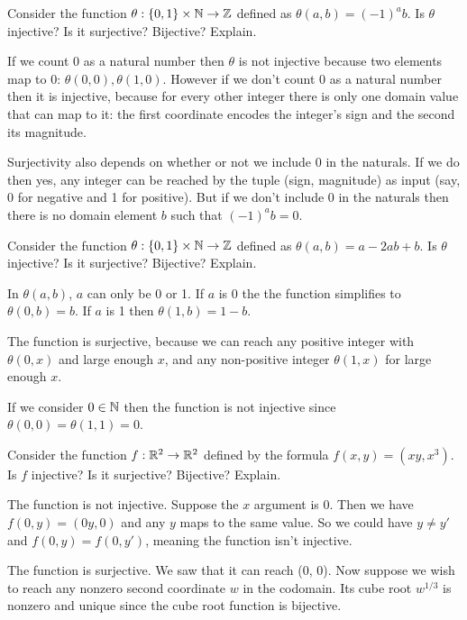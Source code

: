 \documentclass{article}
\begin{document}
\begin{problem}
Consider the function $\theta: \{0, 1\} \times \mathbb{N} \to \mathbb{Z}$ defined as $\theta(a, b) = (-1)^a b.$ Is $\theta$ injective? Is it surjective? Bijective? Explain.
\end{problem}

If we count 0 as a natural number then $\theta$ is not injective because two elements map to 0: $\theta(0, 0), \theta(1, 0)$. However if we don't count 0 as a natural number then it is injective, because for every other integer there is only one domain value that can map to it: the first coordinate encodes the integer's sign and the second its magnitude.

Surjectivity also depends on whether or not we include 0 in the naturals. If we do then yes, any integer can be reached by the tuple (sign, magnitude) as input (say, 0 for negative and 1 for positive). But if we don't include 0 in the naturals then there is no domain element $b$ such that $(-1)^a b = 0$.

\begin{problem}
Consider the function $\theta: \{0, 1\} \times \mathbb{N} \to \mathbb{Z}$ defined as $\theta(a, b) = a - 2ab + b$. Is $\theta$ injective? Is it surjective? Bijective? Explain.
\end{problem}

In $\theta(a, b)$, $a$ can only be 0 or 1. If $a$ is 0 the the function simplifies to $\theta(0, b) = b$. If $a$ is 1 then $\theta(1, b) = 1 - b$.

The function is surjective, because we can reach any positive integer with $\theta(0, x)$ and large enough $x$, and any non-positive integer $\theta(1, x)$ for large enough $x$.

If we consider $0 \in \mathbb{N}$ then the function is not injective since $\theta(0, 0) = \theta(1, 1) = 0$.

\begin{problem}
Consider the function $f: \mathbb{R}^2 \to \mathbb{R}^2$ defined by the formula $f(x, y) = (xy, x^3).$ Is $f$ injective? Is it surjective? Bijective? Explain.
\end{problem}

The function is not injective. Suppose the $x$ argument is 0. Then we have $f(0, y) = (0y, 0)$ and any $y$ maps to the same value. So we could have $y \neq y'$ and $f(0, y) = f(0, y')$, meaning the function isn't injective.

The function is surjective. We saw that it can reach (0, 0). Now suppose we wish to reach any nonzero second coordinate $w$ in the codomain. Its cube root $w^{1/3}$ is nonzero and unique since the cube root function is bijective.
\end{document}
